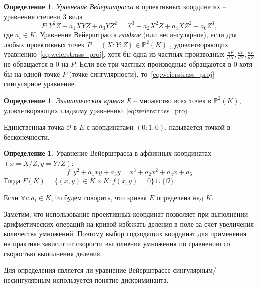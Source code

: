 \documentclass[12pt]{article}
\newcommand{\PP}{{{\mathbb P}}}
\newcommand*{\union}{\mathbin{\cup}}
\newcommand{\bigO}{\mathcal{O}}
\theoremstyle{definition}
\newtheorem{definition}[theorem]{Определение}
\theoremstyle{definition}
\theoremstyle{definition}
\begin{document}
\begin{definition} \textit{Уравнение Вейерштрасса} в проективных координатах -- уравнение степени $3$ вида 
\begin{equation}
\label{eq:weierstrass_proj}
F: Y^2Z + a_1 X Y Z + a_3 Y Z^2 = X^3 + a_2 X^2 Z + a_4 X Z^2 + a_6 Z^3,
\end{equation}
где $a_i \in K$. Уравнение Вейерштрасса \textit{гладкое} (или несингулярное), если для любых проективных точек $P=(X:Y:Z) \in \PP^2(K)$ , удовлетворяющих уравнению~\eqref{eq:weierstrass_proj}, хотя бы одна из частных производных $\frac{dF}{dX},\frac{dF}{dY},\frac{dF}{dZ}$ не обращается в $0$ на $P$. Если все три частных производные обращаются в $0$ хотя бы на одной точке $P$ (точке сингулярности), то~\eqref{eq:weierstrass_proj} -- сингулярное уравнение.
\end{definition}
            
\begin{definition} 
\textit{Эллиптическая кривая} $E$ -- множество всех точек в $\PP^2(K)$, удовлетворяющих гладкому уравнению~\eqref{eq:weierstrass_proj}. 
                
Единственная точка $\bigO$ в $E$ с координатами $(0:1:0)$, называется точкой в бесконечности. 
\end{definition}
            
\begin{definition} 
Уравнение Вейерштрасса в аффинных координатах $(x=X/Z, y=Y/Z)$:
\begin{equation}\label{eq:weierstrass_affine}
f: y^2+a_1xy + a_3y = x^3 + a_2x^2 + a_4x + a_6
\end{equation}
Тогда $F(K) = \{ (x,y) \in K \times K: f(x,y)=0 \} \union \{\bigO\}$.
                
Если $\forall i: a_i \in K$, то будем говорить, что кривая $E$ определена над $K$.
\end{definition}

Заметим, что использование проективных координат позволяет при выполнении арифметических операций на кривой избежать деления в поле за счёт увеличения количества умножений. Поэтому выбор подходящих координат для применения на практике зависит от скорости выполнения умножения по сравнению со скоростью выполнения деления.

Для определения является ли уравнение Вейерштрассе сингулярным/несингулярным используется понятие дискриминанта. 
\end{document}
